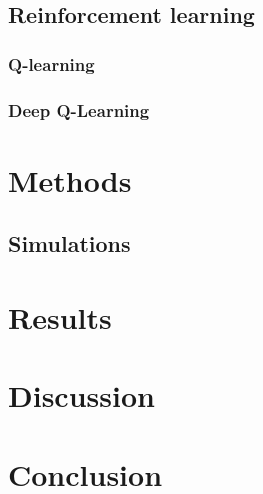 \documentclass[12pt,A4]{report}
\theoremstyle{definition}
\begin{document}
\section{Reinforcement learning}

\subsection{Q-learning}

\subsection{Deep Q-Learning}





\chapter{Methods}

\section{Simulations}




\chapter{Results}




\chapter{Discussion}




\chapter{Conclusion}


\printbibliography
\end{document}
